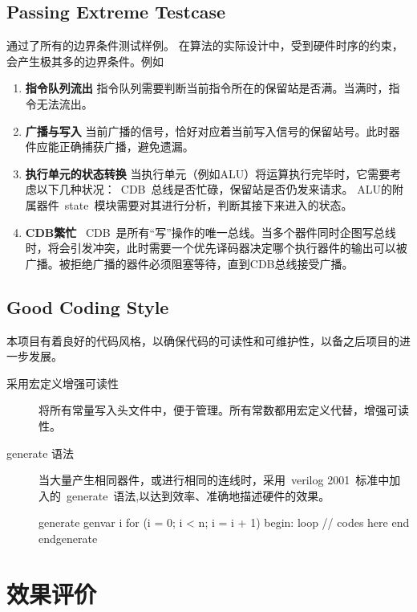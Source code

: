 \documentclass[twoside]{article}
\begin{document}
\subsection{Passing Extreme Testcase} 
通过了所有的边界条件测试样例。  
在算法的实际设计中，受到硬件时序的约束，会产生极其多的边界条件。例如
\begin{enumerate}
	\item \textbf{指令队列流出   }指令队列需要判断当前指令所在的保留站是否满。当满时，指令无法流出。
	\item \textbf{广播与写入   }当前广播的信号，恰好对应着当前写入信号的保留站号。此时器件应能正确捕获广播，避免遗漏。
	\item \textbf{执行单元的状态转换   }当执行单元（例如ALU）将运算执行完毕时，它需要考虑以下几种状况：~CDB~总线是否忙碌，保留站是否仍发来请求。  
	ALU的附属器件~state~模块需要对其进行分析，判断其接下来进入的状态。
	\item \textbf{CDB繁忙   }~CDB~是所有“写”操作的唯一总线。当多个器件同时企图写总线时，将会引发冲突，此时需要一个优先译码器决定哪个执行器件的输出可以被广播。被拒绝广播的器件必须阻塞等待，直到CDB总线接受广播。
\end{enumerate}

\subsection{Good Coding Style}
本项目有着良好的代码风格，以确保代码的可读性和可维护性，以备之后项目的进一步发展。
\begin{description}
	\item[采用宏定义增强可读性]将所有常量写入头文件中，便于管理。所有常数都用宏定义代替，增强可读性。
	\item[generate 语法]当大量产生相同器件，或进行相同的连线时，采用~verilog 2001~标准中加入的~generate~语法,以达到效率、准确地描述硬件的效果。
    \begin{verilogcode}
        generate
            genvar i
            for (i = 0; i < n; i = i + 1) begin: loop
                // codes here
            end
        endgenerate
    \end{verilogcode}
\end{description}

\section{效果评价}
\end{document}
